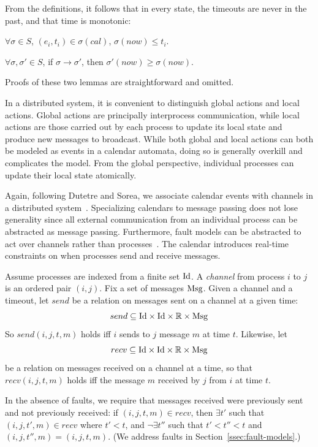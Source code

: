 From the definitions, it follows that in every state, the timeouts are
never in the past, and that time is monotonic:

\begin{lemma}\label{lem:ft} $\forall \sigma \in S$,
$(e_i, t_i) \in \sigma(cal)$, $\sigma(now) \leq t_i$.  \end{lemma}

\begin{lemma} $\forall \sigma, \sigma' \in S$, if
$\sigma \rightarrow \sigma'$, then $\sigma'(now) \geq \sigma(now)$.
\end{lemma}

Proofs of these two lemmas are straightforward and omitted.

In a distributed system, it is convenient to distinguish global actions
and local actions. Global actions are principally interprocess
communication, while local actions are those carried out by each process
to update its local state and produce new messages to broadcast. While
both global and local actions can both be modeled as events in a
calendar automata, doing so is generally overkill and complicates the
model. From the global perspective, individual processes can update
their local state atomically.

Again, following Dutetre and Sorea, we associate calendar events with
channels in a distributed system~\cite{Dutertre-Sorea-2004}. Specializing calendars to
message passing does not lose generality since all external
communication from an individual process can be abstracted as message
passing. Furthermore, fault models can be abstracted to act over
channels rather than processes~\cite{abstractions}. The calendar
introduces real-time constraints on when processes send and receive
messages.

Assume processes are indexed from a finite set $\mathrm{Id}$. A \emph{channel}
from process $i$ to $j$ is an ordered pair $(i,j)$. Fix a set of
messages $\mathrm{Msg}$. Given a channel and a timeout, let $send$ be a relation
on messages sent on a channel at a given time: $$send \subseteq \mathrm{Id}
\times \mathrm{Id} \times \mathbb{R} \times \mathrm{Msg}$$ So $send(i, j, t, m)$ holds
iff $i$ sends to $j$ message $m$ at time $t$. Likewise, let $$recv
\subseteq \mathrm{Id} \times \mathrm{Id} \times \mathbb{R} \times \mathrm{Msg}$$ be a relation
on messages received on a channel at a time, so that $recv(i, j, t, m)$
holds iff the message $m$ received by $j$ from $i$ at time $t$.

In the absence of faults, we require that messages received were
previously sent and not previously received: if $(i, j, t, m) \in recv$,
then $\exists t'$ such that $(i, j, t', m) \in recv$ where $t' < t$, and
$\neg\exists t''$ such that $t' < t'' < t$ and $(i, j, t'', m) = (i, j,
t, m)$. (We address faults in Section~\ref{ssec:fault-models}.)

